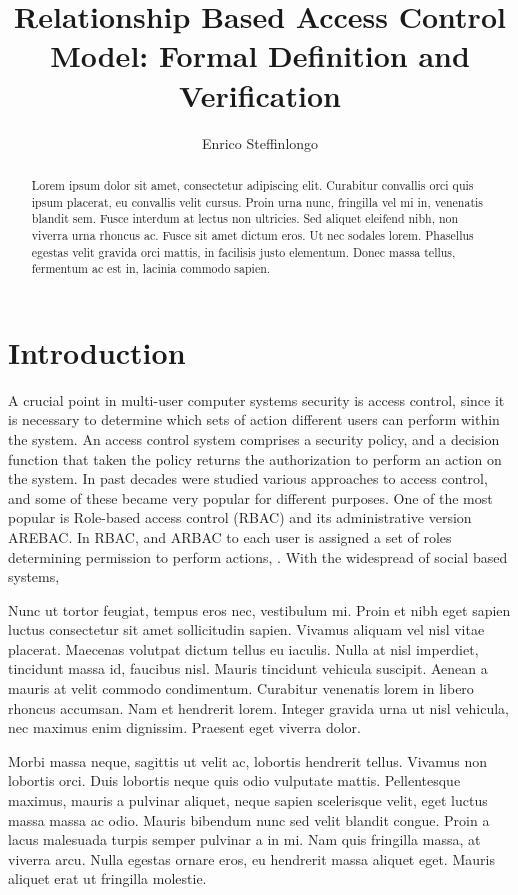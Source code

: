\documentclass[10pt]{llncs}
\author{Enrico Steffinlongo}
\institute{Universit\`{a} Ca' Foscari Venezia}
\title{Relationship Based Access Control Model: Formal Definition and Verification}
\begin{document}
\maketitle

\begin{abstract}
Lorem ipsum dolor sit amet, consectetur adipiscing elit. Curabitur convallis orci quis ipsum placerat, eu convallis velit cursus. Proin urna nunc, fringilla vel mi in, venenatis blandit sem. Fusce interdum at lectus non ultricies. Sed aliquet eleifend nibh, non viverra urna rhoncus ac. Fusce sit amet dictum eros. Ut nec sodales lorem. Phasellus egestas velit gravida orci mattis, in facilisis justo elementum. Donec massa tellus, fermentum ac est in, lacinia commodo sapien.
\end{abstract}

\section{Introduction}
A crucial point in multi-user computer systems security is access control, since it is necessary to determine which sets of action different users can perform within the system. An access control system comprises a security policy, and a decision function that taken the policy returns the authorization to perform an action on the system. In past decades were studied various approaches to access control, and some of these became very popular for different purposes. One of the most popular is Role-based access control (RBAC) and its administrative version AREBAC. In RBAC, and ARBAC to each user is assigned a set of roles determining permission to perform actions, . 
With the widespread of social based systems, 

Nunc ut tortor feugiat, tempus eros nec, vestibulum mi. Proin et nibh eget sapien luctus consectetur sit amet sollicitudin sapien. Vivamus aliquam vel nisl vitae placerat. Maecenas volutpat dictum tellus eu iaculis. Nulla at nisl imperdiet, tincidunt massa id, faucibus nisl. Mauris tincidunt vehicula suscipit. Aenean a mauris at velit commodo condimentum. Curabitur venenatis lorem in libero rhoncus accumsan. Nam et hendrerit lorem. Integer gravida urna ut nisl vehicula, nec maximus enim dignissim. Praesent eget viverra dolor.

Morbi massa neque, sagittis ut velit ac, lobortis hendrerit tellus. Vivamus non lobortis orci. Duis lobortis neque quis odio vulputate mattis. Pellentesque maximus, mauris a pulvinar aliquet, neque sapien scelerisque velit, eget luctus massa massa ac odio. Mauris bibendum nunc sed velit blandit congue. Proin a lacus malesuada turpis semper pulvinar a in mi. Nam quis fringilla massa, at viverra arcu. Nulla egestas ornare eros, eu hendrerit massa aliquet eget. Mauris aliquet erat ut fringilla molestie.
\end{document}
